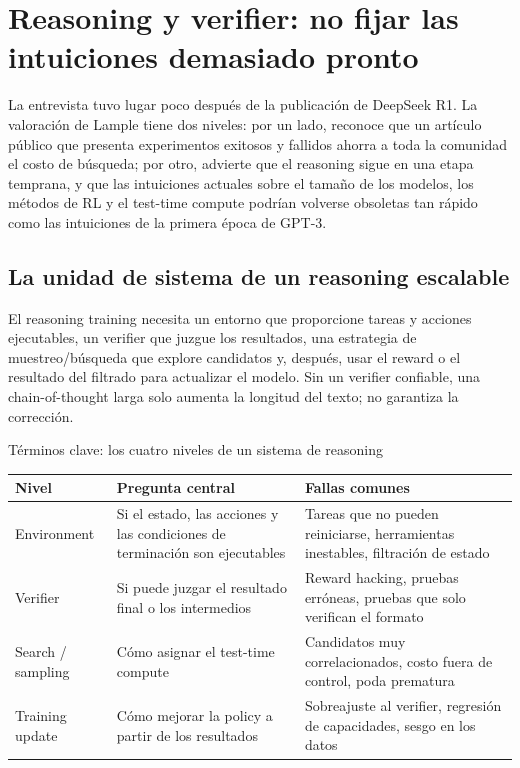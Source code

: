 \section{Reasoning y verifier: no fijar las intuiciones demasiado pronto}

La entrevista tuvo lugar poco después de la publicación de DeepSeek R1. La valoración de Lample tiene dos niveles: por un lado, reconoce que un artículo público que presenta experimentos exitosos y fallidos ahorra a toda la comunidad el costo de búsqueda; por otro, advierte que el reasoning sigue en una etapa temprana, y que las intuiciones actuales sobre el tamaño de los modelos, los métodos de RL y el test-time compute podrían volverse obsoletas tan rápido como las intuiciones de la primera época de GPT-3.

\subsection{La unidad de sistema de un reasoning escalable}

El reasoning training necesita un entorno que proporcione tareas y acciones ejecutables, un verifier que juzgue los resultados, una estrategia de muestreo/búsqueda que explore candidatos y, después, usar el reward o el resultado del filtrado para actualizar el modelo. Sin un verifier confiable, una chain-of-thought larga solo aumenta la longitud del texto; no garantiza la corrección.


\begin{knowledgebox}{Términos clave: los cuatro niveles de un sistema de reasoning}
\begin{tabularx}{\textwidth}{L{0.18\textwidth}X X}
\toprule
Nivel & Pregunta central & Fallas comunes \\
\midrule
Environment & Si el estado, las acciones y las condiciones de terminación son ejecutables & Tareas que no pueden reiniciarse, herramientas inestables, filtración de estado \\
Verifier & Si puede juzgar el resultado final o los intermedios & Reward hacking, pruebas erróneas, pruebas que solo verifican el formato \\
Search / sampling & Cómo asignar el test-time compute & Candidatos muy correlacionados, costo fuera de control, poda prematura \\
Training update & Cómo mejorar la policy a partir de los resultados & Sobreajuste al verifier, regresión de capacidades, sesgo en los datos \\
\bottomrule
\end{tabularx}
\end{knowledgebox}


